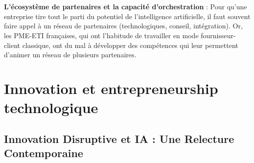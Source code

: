 \\\\
\textbf{L'écosystème de partenaires et la capacité d'orchestration} : Pour qu’une entreprise tire tout le parti du potentiel de l’intelligence artificielle, il faut souvent faire appel à un réseau de partenaires (technologiques, conseil, intégration). Or, les PME-ETI françaises, qui ont l’habitude de travailler en mode fournisseur-client classique, ont du mal à développer des compétences qui leur permettent d’animer un réseau de plusieurs partenaires.

\section{Innovation et entrepreneurship technologique}

\subsection{Innovation Disruptive et IA : Une Relecture Contemporaine}

